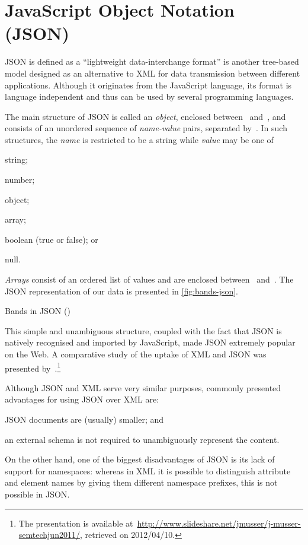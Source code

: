 
\section{JavaScript Object Notation (JSON)}
\label{sec:json}


\ac{JSON} is defined as a ``lightweight data-interchange format'' is another tree-based model designed as an alternative
to \ac{XML} for data transmission between different applications.
%
Although it originates from the JavaScript language, its format is language independent and thus can be used by several
programming languages.

The main structure of \ac{JSON} is called an \emph{object}, enclosed between~\character{\textbraceleft}
and~\character{\textbraceright}, and consists of an unordered sequence of \emph{name-value} pairs, separated
by~\character{:}. 
%
In such structures, the \emph{name} is restricted to be a string while \emph{value} may be one of
\begin{inparaenum}[(a)]
\item string;
\item number;
\item object;
\item array;
\item boolean (true or false); or
\item null.
\end{inparaenum}
%
\emph{Arrays} consist of an ordered list of values and are enclosed between~\character{[} and~\character{]}.
%
The \ac{JSON} representation of our \usecase data is presented in \cref{fig:bands-json}.
%
\begin{data}[t]
  \centering
  
  \caption{Bands in JSON ()}
\label{fig:bands-json}
\end{data}
%
This simple and unambiguous structure, coupled with the fact that \ac{JSON} is natively recognised and imported by
JavaScript, made \ac{JSON} extremely popular on the Web.  A comparative study of the uptake of \ac{XML} and JSON was
presented by~\citet{Musser:2011aa}.\footnote{The presentation is available
  at~\url{http://www.slideshare.net/jmusser/j-musser-semtechjun2011/}, retrieved on 2012/04/10.}


Although \ac{JSON} and \ac{XML} serve very similar purposes, commonly presented advantages for using \ac{JSON} over
\ac{XML} are:
%
\begin{inparaenum}[(i)]
\item \ac{JSON} documents are (usually) smaller; and
\item an external schema is not required to unambiguously represent the content.
\end{inparaenum}
%
On the other hand, one of the biggest disadvantages of \ac{JSON} is its lack of support for namespaces: whereas in
\ac{XML} it is possible to distinguish attribute and element names by giving them different namespace prefixes, this is
not possible in \ac{JSON}.


